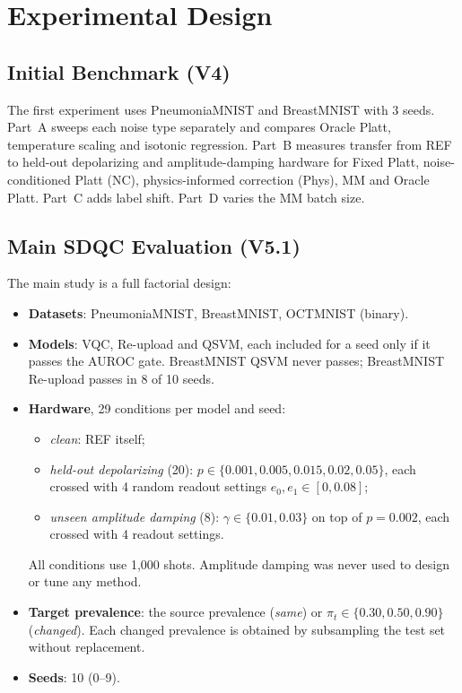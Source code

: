 \documentclass[conference]{IEEEtran}
\begin{document}
\section{Experimental Design}

\subsection{Initial Benchmark (V4)}

The first experiment uses PneumoniaMNIST and BreastMNIST with 3 seeds. Part~A sweeps each noise type separately and compares Oracle Platt, temperature scaling and isotonic regression. Part~B measures transfer from REF to held-out depolarizing and amplitude-damping hardware for Fixed Platt, noise-conditioned Platt (NC), physics-informed correction (Phys), MM and Oracle Platt. Part~C adds label shift. Part~D varies the MM batch size.

\subsection{Main SDQC Evaluation (V5.1)}

The main study is a full factorial design:
\begin{itemize}
\item \textbf{Datasets}: PneumoniaMNIST, BreastMNIST, OCTMNIST (binary).
\item \textbf{Models}: VQC, Re-upload and QSVM, each included for a seed only if it passes the AUROC gate. BreastMNIST QSVM never passes; BreastMNIST Re-upload passes in 8 of 10 seeds.
\item \textbf{Hardware}, 29 conditions per model and seed:
  \begin{itemize}
  \item \emph{clean}: REF itself;
  \item \emph{held-out depolarizing} (20): $p\in\{0.001,0.005,0.015,0.02,0.05\}$, each crossed with 4 random readout settings $e_0,e_1\in[0,0.08]$;
  \item \emph{unseen amplitude damping} (8): $\gamma\in\{0.01,0.03\}$ on top of $p=0.002$, each crossed with 4 readout settings.
  \end{itemize}
  All conditions use 1,000 shots. Amplitude damping was never used to design or tune any method.
\item \textbf{Target prevalence}: the source prevalence (\emph{same}) or $\pi_t\in\{0.30,0.50,0.90\}$ (\emph{changed}). Each changed prevalence is obtained by subsampling the test set without replacement.
\item \textbf{Seeds}: 10 (0--9).
\end{itemize}
\end{document}

